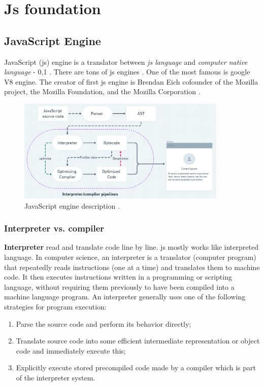 \chapter{Js foundation}

\section{JavaScript Engine}

    JavaScript (\acrshort{js}) engine is a translator between \textit{\acrshort{js} language} and \textit{computer native language} - 0,1  \cite{JavaScriptEngineImage2020}.
    There are tons of \acrshort{js} engines \cite{ECMAScriptEngines}. One of the most famous is google V8 engine. 
    The creator of first \acrshort{js} engine is Brendan Eich cofounder of the Mozilla project, the Mozilla Foundation, and the Mozilla Corporation \cite{BrendanEich}.
    
    \begin{figure}[h]
        \begin{center}
            \includegraphics[width=10cm]{01/images/01-js-engine.png}
            \caption[JavaScript engine]{JavaScript engine description  \cite{JavaScriptEngineImage2020}.}
        \end{center}
    \end{figure}

    \subsection{Interpreter vs. compiler}

        \textbf{Interpreter} read and translate code line by line. \acrshort{js} mostly works like interpreted language.
        In computer science, an interpreter is a translator (computer program) that repeatedly reads instructions (one at a time) and translates them to machine code. 
        It then executes instructions written in a programming or scripting language, without requiring them previously to have been compiled into a machine language program. 
        An interpreter generally uses one of the following strategies for program execution:
            \begin{enumerate}
                \item Parse the source code and perform its behavior directly;
                \item Translate source code into some efficient intermediate representation or object code and immediately execute this;
                \item Explicitly execute stored precompiled code made by a compiler which is part of the interpreter system.
            \end{enumerate}


